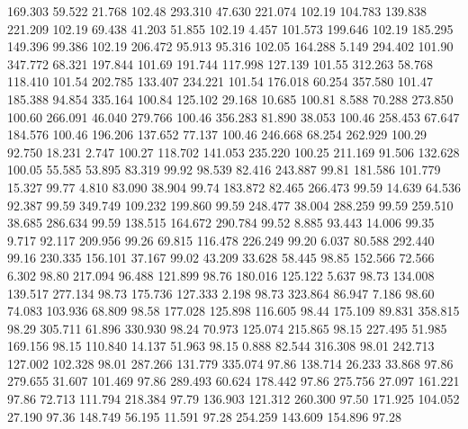  169.303   59.522   21.768       102.48
 293.310   47.630  221.074       102.19
 104.783  139.838  221.209       102.19
  69.438   41.203   51.855       102.19
   4.457  101.573  199.646       102.19
 185.295  149.396   99.386       102.19
 206.472   95.913   95.316       102.05
 164.288    5.149  294.402       101.90
 347.772   68.321  197.844       101.69
 191.744  117.998  127.139       101.55
 312.263   58.768  118.410       101.54
 202.785  133.407  234.221       101.54
 176.018   60.254  357.580       101.47
 185.388   94.854  335.164       100.84
 125.102   29.168   10.685       100.81
   8.588   70.288  273.850       100.60
 266.091   46.040  279.766       100.46
 356.283   81.890   38.053       100.46
 258.453   67.647  184.576       100.46
 196.206  137.652   77.137       100.46
 246.668   68.254  262.929       100.29
  92.750   18.231    2.747       100.27
 118.702  141.053  235.220       100.25
 211.169   91.506  132.628       100.05
  55.585   53.895   83.319        99.92
  98.539   82.416  243.887        99.81
 181.586  101.779   15.327        99.77
   4.810   83.090   38.904        99.74
 183.872   82.465  266.473        99.59
  14.639   64.536   92.387        99.59
 349.749  109.232  199.860        99.59
 248.477   38.004  288.259        99.59
 259.510   38.685  286.634        99.59
 138.515  164.672  290.784        99.52
   8.885   93.443   14.006        99.35
   9.717   92.117  209.956        99.26
  69.815  116.478  226.249        99.20
   6.037   80.588  292.440        99.16
 230.335  156.101   37.167        99.02
  43.209   33.628   58.445        98.85
 152.566   72.566    6.302        98.80
 217.094   96.488  121.899        98.76
 180.016  125.122    5.637        98.73
 134.008  139.517  277.134        98.73
 175.736  127.333    2.198        98.73
 323.864   86.947    7.186        98.60
  74.083  103.936   68.809        98.58
 177.028  125.898  116.605        98.44
 175.109   89.831  358.815        98.29
 305.711   61.896  330.930        98.24
  70.973  125.074  215.865        98.15
 227.495   51.985  169.156        98.15
 110.840   14.137   51.963        98.15
   0.888   82.544  316.308        98.01
 242.713  127.002  102.328        98.01
 287.266  131.779  335.074        97.86
 138.714   26.233   33.868        97.86
 279.655   31.607  101.469        97.86
 289.493   60.624  178.442        97.86
 275.756   27.097  161.221        97.86
  72.713  111.794  218.384        97.79
 136.903  121.312  260.300        97.50
 171.925  104.052   27.190        97.36
 148.749   56.195   11.591        97.28
 254.259  143.609  154.896        97.28
